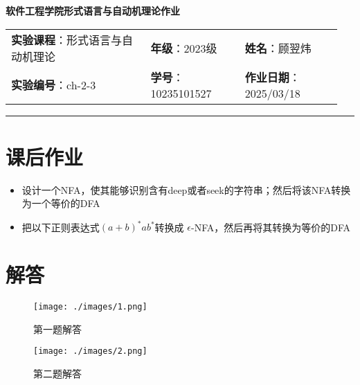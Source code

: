 \documentclass{article}
\begin{document}
	
	\begin{center}
		{\Large{\textbf{\heiti 软件工程学院形式语言与自动机理论作业}}}
		\begin{table}[htb]
			\flushleft
			\begin{tabular}{p{0.4\linewidth}p{0.27\linewidth}p{0.28\linewidth}}\\
				\textbf{实验课程}：形式语言与自动机理论  & \textbf{年级}：2023级       & \textbf{姓名}：顾翌炜  \\
				\textbf{实验编号}：ch-2-3    & \textbf{学号}：10235101527 & \textbf{作业日期}：2025/03/18  \\
			\end{tabular}
		\end{table}
	\end{center}
	\rule{\textwidth}{2pt}
	
	\section*{课后作业}
	
	\begin{itemize}
		\item 设计一个NFA，使其能够识别含有deep或者seek的字符串；然后将该NFA转换为一个等价的DFA
		
		\item 把以下正则表达式$ (a + b)^* ab^* $转换成 $\epsilon$-NFA，然后再将其转换为等价的DFA
		
	\end{itemize}
	
	\section*{解答}
	
	\begin{figure}[H]
		\centering
		\texttt{[image: ./images/1.png]}
		\caption{第一题解答}
	\end{figure}
	
	\begin{figure}[H]
		\centering
		\texttt{[image: ./images/2.png]}
		\caption{第二题解答}
	\end{figure}
\end{document}
